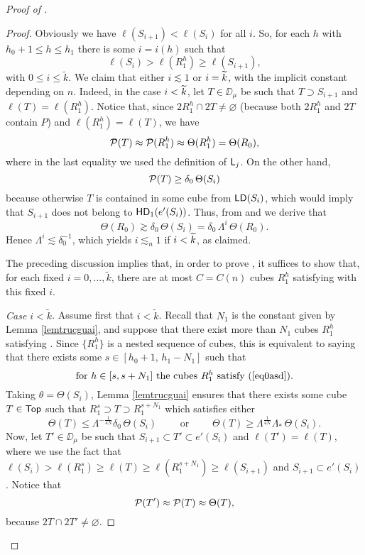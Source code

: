 \begin{proof}[Proof of ]
\begin{proof}
Obviously we have  $\ell(S_{i+1})<\ell(S_i)$ for all $i$.
So, for each $h$ with $h_0+1\leq h\leq h_1$ there is some $i=i(h)$ such that 
\begin{equation}\label{eq0asd}
\ell(S_i)>\ell(R_1^h)\geq \ell(S_{i+1}),
\end{equation}
with $0\leq i \leq \tilde k$. 
We claim that either $i\lesssim 1$ or $i={\widetilde{k}}$, with the implicit constant depending on $n$. 
Indeed, in the case $i<{\widetilde{k}}$, let $T\in\DD_\mu$ be such that $T\supset S_{i+1}$ and $\ell(T)=\ell(R_1^h)$.
Notice that, since $2R_1^h\cap 2T\neq \varnothing$ (because both $2R_1^h$ and $2T$ contain $P$) and 
$\ell(R_1^h)=\ell(T)$, we have
\begin{equation}\label{eq1asd}
{\mathcal P}(T) \approx {\mathcal P}(R_1^h)\approx \Theta(R_1^h)=\Theta(R_0),
\end{equation}
where in the last equality we used the definition of ${\mathsf{L}}_j$.
On the other hand, 
\begin{equation}\label{eq2asd}
{\mathcal P}(T)\geq \delta_0\,\Theta(S_i)
\end{equation} 
because otherwise 
$T$ is contained in some cube from ${\mathsf{LD}}(S_i)$, which would imply that $S_{i+1}$ does not belong to ${\mathsf{HD}}_1(e'(S_i))$.
Thus, from  and 
we derive that
$$\Theta(R_0)\gtrsim \delta_0\,\Theta(S_i) =  \delta_0\,\Lambda^i\,\Theta(R_0).$$
Hence  $\Lambda^i\lesssim\delta_0^{-1}$, which yields $i\lesssim_n 1$ if $i<{\widetilde{k}}$, as claimed.

The preceding discussion implies that, in order to prove , it suffices to show that, for each fixed 
$i=0,\ldots,\tilde k$, there are at most $C=C(n)$ cubes $R_1^h$ satisfying 
 with this fixed $i$. 

\emph{Case $i<\tilde k$}. Assume first that $i<\tilde k$. Recall that $N_1$ is the constant given by Lemma \ref{lemtrucguai}, and suppose that there exist more than $N_1$ cubes $R_1^h$ satisfying 
. Since $\{R_1^h\}$ is a nested sequence of cubes, this is equivalent to saying that there exists some $s\in [h_0+1,\, h_1-N_1]$ such that
\begin{equation}\label{eqfam11}
\text{for $h\in[s,s+N_1]$ the cubes $R_1^h$ satisfy \rf{eq0asd}.}
\end{equation}
Taking $\theta=\Theta(S_{i})$, Lemma \ref{lemtrucguai} ensures
that there exists some cube $T\in{\mathsf {Top}}$ such that $R_1^s\supset T\supset R_1^{s+N_1}$ which satisfies either
\begin{equation}\label{eqdisju9}
\Theta(T)\leq \Lambda^{-\frac1{4N}}\delta_0\,\Theta(S_i) \qquad\mbox{ or }\qquad 
\Theta(T)\geq \Lambda^{\frac1{4N}}\Lambda_*\,\Theta(S_i).
\end{equation}
Now, let $T'\in\DD_\mu$ be such that $S_{i+1}\subset T'\subset e'(S_{i})$ and $\ell(T')=\ell(T)$, where we use the fact that $\ell(S_i)>\ell(R_1^s)\ge \ell(T)\ge\ell(R_1^{s+N_1})\ge\ell(S_{i+1})$ and $S_{i+1}\subset e'(S_i)$. Notice that
\begin{equation}\label{eqdisju99}
{\mathcal P}(T')\approx{\mathcal P}(T)\approx \Theta(T),
\end{equation}
because $2T\cap 2T'\neq\varnothing$.


\end{proof}
\end{proof}
